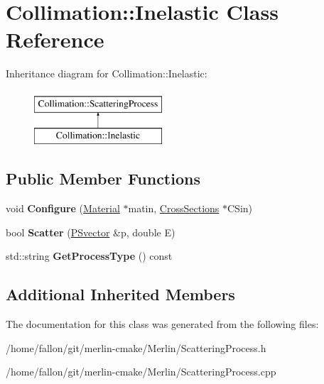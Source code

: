 \hypertarget{classCollimation_1_1Inelastic}{}\section{Collimation\+:\+:Inelastic Class Reference}
\label{classCollimation_1_1Inelastic}
Inheritance diagram for Collimation\+:\+:Inelastic\+:\begin{figure}[H]
\begin{center}
\leavevmode
\includegraphics[height=2.000000cm]{classCollimation_1_1Inelastic}
\end{center}
\end{figure}
\subsection*{Public Member Functions}
\begin{DoxyCompactItemize}
\item 
\mbox{\label{classCollimation_1_1Inelastic_aa42cf6edfaaaed8e8168161328e9ff0d}} 
void {\bfseries Configure} (\hyperlink{classMaterial}{Material} $\ast$matin, \hyperlink{classCollimation_1_1CrossSections}{Cross\+Sections} $\ast$C\+Sin)
\item 
\mbox{\label{classCollimation_1_1Inelastic_aa7e042df2353413fb4c408db129663df}} 
bool {\bfseries Scatter} (\hyperlink{classPSvector}{P\+Svector} \&p, double E)
\item 
\mbox{\label{classCollimation_1_1Inelastic_a8cfb7de711cfad66ba13409aa0060c39}} 
std\+::string {\bfseries Get\+Process\+Type} () const
\end{DoxyCompactItemize}
\subsection*{Additional Inherited Members}


The documentation for this class was generated from the following files\+:\begin{DoxyCompactItemize}
\item 
/home/fallon/git/merlin-\/cmake/\+Merlin/Scattering\+Process.\+h\item 
/home/fallon/git/merlin-\/cmake/\+Merlin/Scattering\+Process.\+cpp\end{DoxyCompactItemize}

